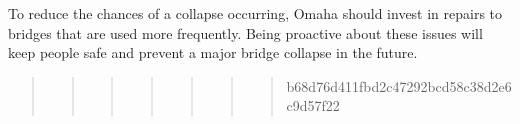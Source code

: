 \documentclass[
  letterpaper,
  DIV=11,
  numbers=noendperiod]{scrreprt}
\begin{document}
To reduce the chances of a collapse occurring, Omaha should invest in
repairs to bridges that are used more frequently. Being proactive about
these issues will keep people safe and prevent a major bridge collapse
in the future.

\begin{quote}
\begin{quote}
\begin{quote}
\begin{quote}
\begin{quote}
\begin{quote}
\begin{quote}
b68d76d411fbd2c47292bcd58c38d2e6c9d57f22
\end{quote}
\end{quote}
\end{quote}
\end{quote}
\end{quote}
\end{quote}
\end{quote}
\end{document}
